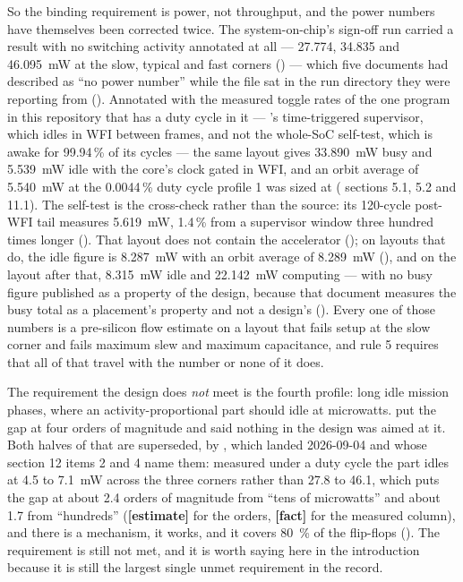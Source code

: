 So the binding requirement is power, not throughput, and the power
numbers have themselves been corrected twice. The system-on-chip's
sign-off run carried a  result with no switching
activity annotated at all --- 27.774, 34.835 and
\qty{46.095}{\milli\watt} at the slow, typical and fast corners
() --- which five documents had described as
``no power number'' while the file sat in the run directory they were
reporting from (). Annotated with the measured toggle rates of
the one program in this repository that has a duty cycle in it ---
's time-triggered supervisor, which idles in WFI between
frames, and not the whole-SoC self-test, which is awake for 99.94\,\% of
its cycles --- the same layout gives \qty{33.890}{\milli\watt}
busy and \qty{5.539}{\milli\watt} idle with the core's clock gated in
WFI, and an orbit average of \qty{5.540}{\milli\watt} at the 0.0044\,\%
duty cycle profile 1 was sized at ( sections 5.1, 5.2 and
11.1). The self-test is the cross-check rather than the source: its
120-cycle post-WFI tail measures \qty{5.619}{\milli\watt}, 1.4\,\% from
a supervisor window three hundred times longer
(). That layout does not contain the accelerator
(); on layouts that do, the idle figure is
\qty{8.287}{\milli\watt} with an orbit average of
\qty{8.289}{\milli\watt} (), and on the layout
after that, \qty{8.315}{\milli\watt} idle and \qty{22.142}{\milli\watt}
computing --- with no busy figure published as a property of the design,
because that document measures the busy total as a placement's property
and not a design's (). Every one of those
numbers is a pre-silicon flow estimate on a layout that fails setup at
the slow corner and fails maximum slew and maximum capacitance, and
 rule 5 requires that all of that travel with the
number or none of it does.

The requirement the design does \emph{not} meet is the fourth profile:
long idle mission phases, where an activity-proportional part should
idle at microwatts.  put the gap at four orders
of magnitude and said nothing in the design was aimed at it. Both halves
of that are superseded, by , which landed 2026-09-04 and
whose section 12 items 2 and 4 name them: measured under a duty cycle
the part idles at 4.5 to \qty{7.1}{\milli\watt} across the three corners
rather than 27.8 to 46.1, which puts the gap at about 2.4 orders of
magnitude from ``tens of microwatts'' and about 1.7 from ``hundreds''
(\textbf{[estimate]} for the orders, \textbf{[fact]} for the measured
column), and there is a mechanism, it works, and it covers
\qty{80}{\percent} of the flip-flops (). The
requirement is still not met, and it is worth saying here in the
introduction because it is still the largest single unmet requirement in
the record.

